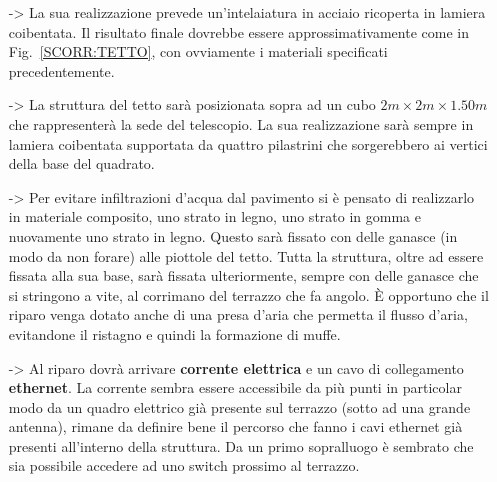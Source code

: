\documentclass[a4paper,12pt]{article}
\begin{document}
\begin{itemize}
	\item[->]La sua realizzazione prevede un'intelaiatura in acciaio ricoperta in lamiera coibentata. Il risultato finale dovrebbe essere approssimativamente come in Fig.~\ref{SCORR:TETTO}, con ovviamente i materiali specificati precedentemente.

	\item[->]La struttura del tetto sar\`a posizionata sopra ad un cubo $2m\times2m\times1.50m$ che rappresenter\`a la sede del telescopio. La sua realizzazione sar\`a sempre in lamiera coibentata supportata da quattro pilastrini che sorgerebbero ai vertici della base del quadrato.

	\item[->]Per evitare infiltrazioni d'acqua dal pavimento si \`e pensato di realizzarlo in  materiale composito, uno strato in legno, uno strato in gomma e nuovamente uno strato in legno. Questo sar\`a fissato con delle ganasce (in modo da non forare) alle piottole del tetto. Tutta la struttura, oltre ad essere fissata alla sua base, sar\`a fissata ulteriormente, sempre con delle ganasce che si stringono a vite, al corrimano del terrazzo che fa angolo. \`E opportuno che il riparo venga dotato anche di una presa d'aria che permetta il flusso d'aria, evitandone il ristagno e quindi la formazione di muffe.

	\item[->]Al riparo dovr\`a arrivare \textbf{corrente elettrica} e un cavo di collegamento \textbf{ethernet}. La corrente sembra essere accessibile da pi\`u punti in particolar modo da un quadro elettrico gi\`a presente sul terrazzo (sotto ad una grande antenna), rimane da definire bene il percorso che fanno i cavi ethernet gi\`a presenti all'interno della struttura. Da un primo sopralluogo \`e sembrato che sia possibile accedere ad uno switch prossimo al terrazzo.
\end{itemize}
\end{document}
